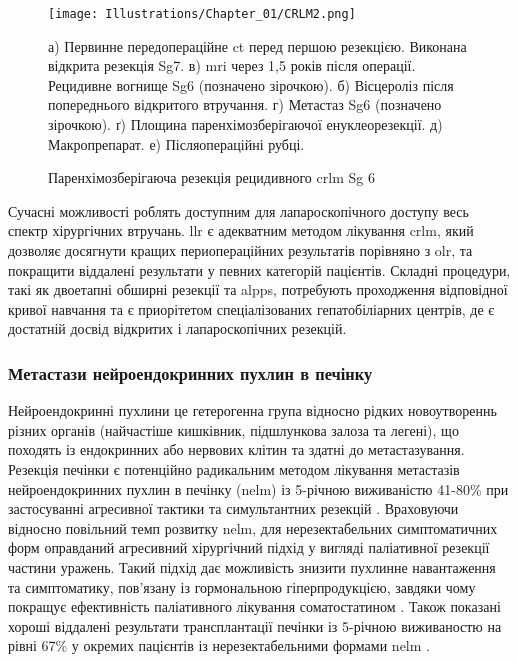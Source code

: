 \begin{figure}[!ht]
\caption{Паренхімозберігаюча резекція рецидивного \acrshort{crlm} Sg 6}

\texttt{[image: Illustrations/Chapter\_01/CRLM2.png]}
\label{fig:CRLM2}

\medskip
\small
а) Первинне передопераційне \acrshort{ct} перед першою резекцією. Виконана відкрита резекція Sg7. в) \acrshort{mri} через 1,5 років після операції. Рецидивне вогнище Sg6 (позначено зірочкою). б) Вісцероліз після попереднього відкритого втручання. г) Метастаз Sg6 (позначено зірочкою). ґ) Площина паренхімозберігаючої енуклеорезекції. д) Макропрепарат. е) Післяопераційні рубці.

\end{figure}




Сучасні можливості роблять доступним для лапароскопічного доступу весь спектр хірургічних втручань. \acrshort{llr} є адекватним методом лікування \acrshort{crlm}, який дозволяє досягнути кращих периопераційних результатів порівняно з \acrshort{olr}, та покращити віддалені результати у певних категорій пацієнтів. Складні процедури, такі як  двоетапні обширні резекції та \acrshort{alpps}, потребують проходження відповідної кривої навчання та є приорітетом спеціалізованих гепатобіліарних центрів, де є достатній досвід відкритих і лапароскопічних резекцій.

\subsubsection{Метастази нейроендокринних пухлин в печінку}

Нейроендокринні пухлини це гетерогенна група відносно рідких новоутвореннь різних органів (найчастіше кишківник, підшлункова залоза та легені), що походять із ендокринних або нервових клітин та здатні до метастазування. Резекція печінки є потенційно радикальним методом лікування метастазів нейроендокринних пухлин в печінку (\acrshort{nelm}) із 5-річною виживаністю 41-80\% при застосуванні агресивної тактики та симультантних резекцій \cite{Liu2009}. Враховуючи відносно повільний темп розвитку \acrshort{nelm}, для нерезектабельних симптоматичних форм оправданий агресивний хірургічний підхід у вигляді паліативної резекції частини уражень. Такий підхід дає можливість знизити пухлинне навантаження та симптоматику, пов'язану із гормональною гіперпродукцією, завдяки чому покращує ефективність паліативного лікування соматостатином \cite{Schmidt2014}. Також показані хороші віддалені результати трансплантації печінки із 5-річною виживаностю на рівні 67\% у окремих пацієнтів із нерезектабельними формами \acrshort{nelm} \cite{Moris2017a}.

